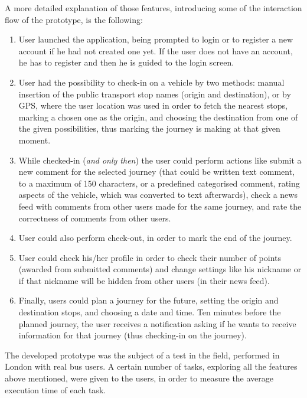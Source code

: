 A more detailed explanation of those features, introducing some of the interaction flow of the prototype, is the following:

\begin{enumerate}
\item User launched the application, being prompted to login or to register a new account if he had not created one yet. If the user does not have an account, he has to register and then he is guided to the login screen.

\item User had the possibility to check-in on a vehicle by two methods: manual insertion of the public transport stop names (origin and destination), or by GPS, where the user location was used in order to fetch the nearest stops, marking a chosen one as the origin, and choosing the destination from one of the given possibilities, thus marking the journey is making at that given moment.

\item While checked-in (\emph{and only then}) the user could perform actions like submit a new comment for the selected journey (that could be written text comment, to a maximum of 150 characters, or a predefined categorised comment, rating aspects of the vehicle, which was converted to text afterwards), check a news feed with comments from other users made for the same journey, and rate the correctness of comments from other users.

\item User could also perform check-out, in order to mark the end of the journey.

\item User could check his/her profile in order to check their number of points (awarded from submitted comments) and change settings like his nickname or if that nickname will be hidden from other users (in their news feed).

\item Finally, users could plan a journey for the future, setting the origin and destination stops, and choosing a date and time. Ten minutes before the planned journey, the user receives a notification asking if he wants to receive information for that journey (thus checking-in on the journey).
 
\end{enumerate}

The developed prototype was the subject of a test in the field, performed in London with real bus users. A certain number of tasks, exploring all the features above mentioned, were given to the users, in order to measure the average execution time of each task.

